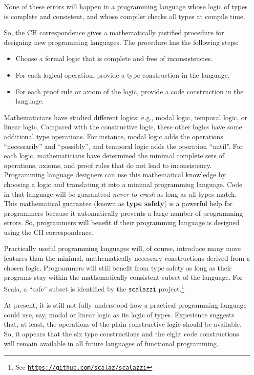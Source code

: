 None of these errors will happen in a programming language whose logic
of types is complete and consistent, and whose compiler checks all
types at compile time. 

So, the CH correspondence gives a mathematically justified procedure
for designing new programming languages. The procedure has the following
steps:
\begin{itemize}
\item Choose a formal logic that is complete and free of inconsistencies.
\item For each logical operation, provide a type construction in the language.
\item For each proof rule or axiom of the logic, provide a code construction
in the language.
\end{itemize}
Mathematicians have studied different logics: e.g., modal logic, temporal
logic, or linear logic. Compared with the constructive logic, these
other logics have some additional type operations. For instance, modal
logic adds the operations \textsf{``}necessarily\textsf{''} and \textsf{``}possibly\textsf{''}, and
temporal logic adds the operation \textsf{``}until\textsf{''}. For each logic, mathematicians
have determined the minimal complete sets of operations, axioms, and
proof rules that do not lead to inconsistency. Programming language
designers can use this mathematical knowledge by choosing a logic
and translating it into a minimal programming language. Code in that
language will be guaranteed \emph{never to crash} as long as all types
match. This mathematical guarantee (known as \textbf{type
safety}) is a powerful help for programmers because it automatically
prevents a large number of programming errors. So, programmers will
benefit if their programming language is designed using the CH correspondence.

Practically useful programming languages will, of course, introduce
many more features than the minimal, mathematically necessary constructions
derived from a chosen logic. Programmers will still benefit from type
safety as long as their programs stay within the mathematically consistent
subset of the language. For Scala, a \textsf{``}safe\textsf{''} subset is identified
by the \texttt{scalazzi} project.\footnote{See \texttt{\href{https://github.com/scalaz/scalazzi}{https://github.com/scalaz/scalazzi}}}

At present, it is still not fully understood how a practical programming
language could use, say, modal or linear logic as its logic of types.
Experience suggests that, at least, the operations of the plain constructive
logic should be available. So, it appears that the six type constructions
and the eight code constructions will remain available in all future
languages of functional programming. 

